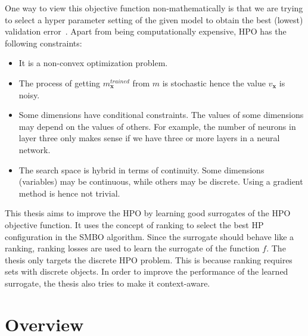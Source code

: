 \documentclass[12pt, twoside, ngerman]{report}
\begin{document}
One way to view this objective function non-mathematically is that we are trying to select a hyper parameter setting of the given model to obtain the best (lowest) validation error~\cite{fsbopaper}.  Apart from being computationally expensive,  HPO has the following constraints:

\begin{itemize}
\item It is a non-convex optimization problem.
\item The process of getting $m^{trained}_\textbf{x}$ from $m$ is stochastic hence the value $v_{\textbf{x}}$ is noisy.
\item Some dimensions have conditional constraints. The values of some dimensions may depend on the values of others. For example, the number of neurons in layer three only makes sense if we have three or more layers in a neural network.
\item The search space is hybrid in terms of continuity. Some dimensions (variables) may be continuous, while others may be discrete.
Using a gradient method is hence not trivial.
\end{itemize}

This thesis aims to improve the HPO by learning good surrogates of the HPO objective function. It uses the concept of ranking to select the best HP configuration in the SMBO algorithm. Since the surrogate should behave like a ranking, ranking losses are used to learn the surrogate of the function $f$. The thesis only targets the discrete HPO problem. This is because ranking requires sets with discrete objects. In order to improve the performance of the learned surrogate, the thesis also tries to make it context-aware.

\label{ProblemOverviewlabel}

\section{Overview}
\end{document}
